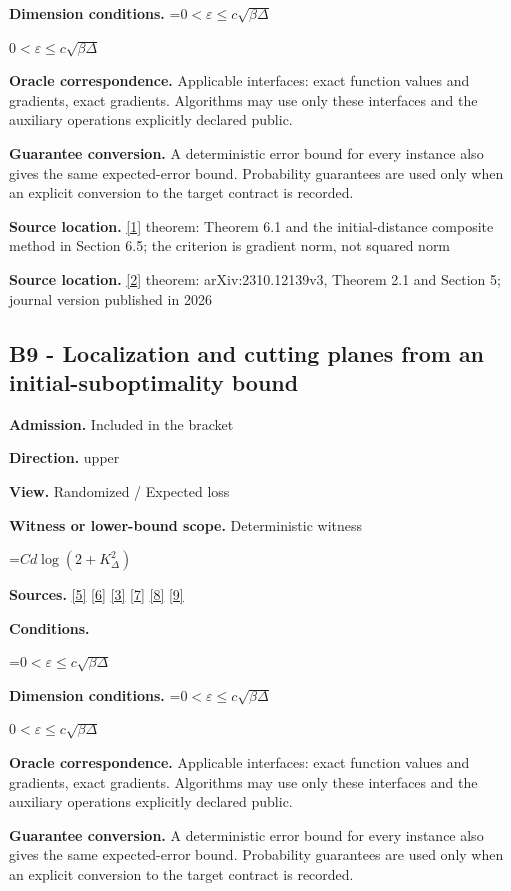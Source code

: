 \documentclass[10pt,a4paper]{article}
\newcommand{\AtlasMath}[1]{\par\begingroup\centering\setbox0=\hbox{$\displaystyle #1$}\ifdim\wd0>1.4\linewidth\typeout{ATLAS WIDE FORMULA: \the\wd0}\fi\ifdim\wd0>\linewidth\resizebox{\linewidth}{!}{\box0}\else\box0\fi\par\endgroup}
\newcommand{\AtlasInlineMath}[1]{\begingroup\setbox0=\hbox{$#1$}\ifdim\wd0>.4\linewidth\endgroup\AtlasMath{#1}\else\endgroup$#1$\fi}
\begin{document}
\textbf{Dimension conditions.} \AtlasInlineMath{0<\varepsilon\le c\sqrt{\beta\Delta}}

\textbf{Oracle correspondence.} Applicable interfaces: exact function values and gradients, exact gradients. Algorithms may use only these interfaces and the auxiliary operations explicitly declared public.

\textbf{Guarantee conversion.} A deterministic error bound for every instance also gives the same expected-error bound. Probability guarantees are used only when an explicit conversion to the target contract is recorded.

\textbf{Source location.} \href{https://arxiv.org/pdf/1803.06600v4}{[1]} theorem: Theorem 6.1 and the initial-distance composite method in Section 6.5; the criterion is gradient norm, not squared norm

\textbf{Source location.} \href{https://doi.org/10.1007/s10107-026-02352-2}{[2]} theorem: arXiv:2310.12139v3, Theorem 2.1 and Section 5; journal version published in 2026

\subsection{B9 - Localization and cutting planes from an initial-suboptimality bound}
\textbf{Admission.} Included in the bracket

\textbf{Direction.} upper

\textbf{View.} Randomized / Expected loss

\textbf{Witness or lower-bound scope.} Deterministic witness

\AtlasMath{C d\log(2+K_\Delta^2)}
\textbf{Sources.} \href{https://arxiv.org/pdf/2101.09740v2}{[5]} \href{https://arxiv.org/pdf/2609.33360v2}{[6]} \href{https://arxiv.org/pdf/2609.10874}{[3]} \href{https://arxiv.org/pdf/1405.4980}{[7]} \href{https://www2.isye.gatech.edu/~nemirovs/MOR_AccuracyCertificates.pdf}{[8]} \href{https://arxiv.org/pdf/2609.20701}{[9]}

\textbf{Conditions.} 
\AtlasMath{0<\varepsilon\le c\sqrt{\beta\Delta}}


\textbf{Dimension conditions.} \AtlasInlineMath{0<\varepsilon\le c\sqrt{\beta\Delta}}

\textbf{Oracle correspondence.} Applicable interfaces: exact function values and gradients, exact gradients. Algorithms may use only these interfaces and the auxiliary operations explicitly declared public.

\textbf{Guarantee conversion.} A deterministic error bound for every instance also gives the same expected-error bound. Probability guarantees are used only when an explicit conversion to the target contract is recorded.
\end{document}
